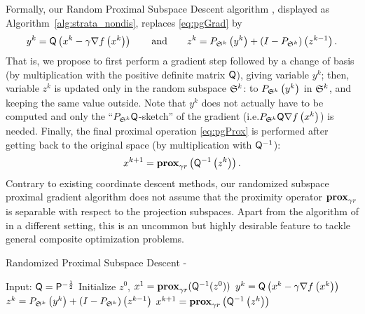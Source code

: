 Formally, our Random Proximal Subspace Descent algorithm \algo, displayed as Algorithm~\ref{alg:strata_nondis}, replaces \eqref{eq:pgGrad} by 
\begin{equation}\label{eq:grad_step}
    y^k = {\mathsf{Q}}\left(x^k - \gamma\nabla f\left(x^k\right)\right)\qquad\text{and}\qquad
    z^{k} = P_{\mathfrak{S}^k} \left(y^k\right) + (I- P_{\mathfrak{S}^k} ) \left(z^{k-1}\right).
\end{equation}
That is, we propose to first perform a gradient step followed by a change of basis {(by multiplication with the positive definite matrix ${\mathsf{Q}}$), giving variable $y^k$}; then, variable $z^k$ is updated only in the random subspace $\mathfrak{S}^k$: to  $P_{\mathfrak{S}^k} \left(y^k\right)$ in $\mathfrak{S}^k$, and keeping the same value outside. Note that $y^k$ does not actually have to be computed and only the ``$P_{\mathfrak{S}^k}{\mathsf{Q}}$-sketch'' of the gradient (i.e.\;$ P_{\mathfrak{S}^k}{\mathsf{Q}}\nabla f\left(x^k\right)$) is needed. Finally, the final proximal operation \eqref{eq:pgProx} is performed {after getting back to the original space (by multiplication with ${\mathsf{Q}}^{-1}$)}:
\begin{align}\label{eq:prox_step}
   x^{k+1} = \mathbf{prox}_{\gamma r} \left({\mathsf{Q}}^{-1}\left(z^{k}\right)\right).
\end{align}
Contrary to existing coordinate descent methods, our randomized subspace proximal gradient algorithm does not assume that the proximity operator $\mathbf{prox}_{\gamma r} $ is separable with respect to the projection subspaces. Apart from the algorithm of \cite{hanzely2018sega} in a different setting, this is an uncommon but highly desirable feature to tackle general composite optimization problems.  

\begin{algorithm} %
\caption{Randomized Proximal Subspace Descent - \algo}
\label{alg:strata_nondis} %
\begin{algorithmic}[1] %
    \STATE Input:  ${\mathsf{Q}} = {\mathsf{P}}^{-\frac12}$
    \STATE Initialize $z^0$, $x^1 = \mathbf{prox}_{\gamma r}({\mathsf{Q}}^{-1}(z^0))$
            \STATE $y^k = {\mathsf{Q}}\left(x^k - \gamma\nabla f\left(x^k\right)\right)$
            \STATE $z^{k} = P_{\mathfrak{S}^k} \left(y^k\right) + (I- P_{\mathfrak{S}^k} ) \left(z^{k-1}\right)$
            \STATE$x^{k+1} = \mathbf{prox}_{\gamma r} \left({\mathsf{Q}}^{-1}\left(z^{k}\right)\right)$
    \ENDFOR
\end{algorithmic}
\end{algorithm}

